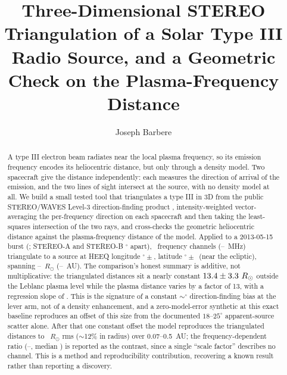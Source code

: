 \documentclass[twocolumn]{aastex631}
\newcommand{\code}[1]{\texttt{#1}}
\begin{document}
\title{Three-Dimensional STEREO Triangulation of a Solar Type III Radio Source, and a
Geometric Check on the Plasma-Frequency Distance}

\author[0009-0008-3289-4447]{Joseph Barbere}

\begin{abstract}
A type III electron beam radiates near the local plasma frequency, so its emission frequency encodes
its heliocentric distance, but only through a density model. Two spacecraft give the distance
independently: each measures the direction of arrival of the emission, and the two lines of
sight intersect at the source, with no density model at all. We build a small tested tool
that triangulates a type III in 3D from the public STEREO/WAVES \citep{bougeret2008} Level-3
direction-finding product \citep{cecconi2008,krupar2012}, intensity-weighted vector-averaging the
per-frequency direction on each spacecraft and then taking the least-squares intersection of the two
rays, and cross-checks the geometric heliocentric distance against the plasma-frequency distance of
the \citet{leblanc1998} model. Applied to a 2013-05-15 burst
(\code{\triSource}; STEREO-A and STEREO-B \triSep$^\circ$ apart), \triNtri\ frequency channels
(\triFlo--\triFhi~MHz) triangulate to a source at HEEQ longitude \triLon$^\circ\pm$\triLonScatter,
latitude \triLat$^\circ\pm$\triLatScatter\ (near the ecliptic), spanning
\triRlo--\triRhi~$R_\odot$ (\triRloAU--\triRhiAU~AU). The comparison's honest summary is
additive, not multiplicative: the triangulated distances sit a nearly constant
$13.4\pm3.3~R_\odot$ outside the Leblanc plasma level while the plasma
distance varies by a factor of 13, with a regression slope of \triOlsSlope. This is the signature
of a constant $\sim$\triBiasDeg$^\circ$ direction-finding bias at the lever arm, not of a
density enhancement, and a zero-model-error synthetic at this exact baseline reproduces an
offset of this size from the documented $18$--$25^\circ$ apparent-source scatter alone. After
that one constant offset the model reproduces the triangulated distances to
\triRmsAdd~$R_\odot$ rms ($\sim$12\% in radius) over 0.07--0.5~AU; the
frequency-dependent ratio (\triRatioMin--\triRatioMax, median \triRatio) is reported as the
contrast, since a single ``scale factor'' describes no channel. This is a method and
reproducibility contribution, recovering a known result rather than reporting a discovery.
\end{abstract}

\end{document}
